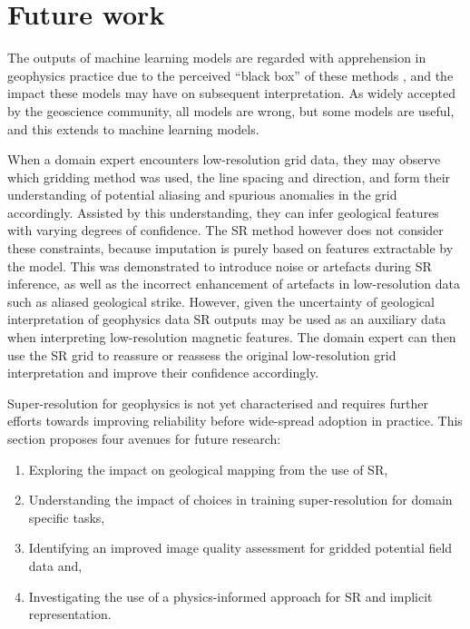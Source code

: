 % 
% 


\chapter{Future work}
\label{ch:futurework}
The outputs of machine learning models are regarded with apprehension in geophysics practice due to the perceived “black box” of these methods \parencite{delaatAlgorithmicDecisionMakingBased2018,rudinStopExplainingBlack2019}, and the impact these models may have on subsequent interpretation.
As widely accepted by the geoscience community, all models are wrong, but some models are useful, and this extends to machine learning models.

When a domain expert encounters low-resolution grid data, they may observe which gridding method was used, the line spacing and direction, and form their understanding of potential aliasing and spurious anomalies in the grid accordingly.
Assisted by this understanding, they can infer geological features with varying degrees of confidence.
The SR method however does not consider these constraints, because imputation is purely based on features extractable by the model.
This was demonstrated to introduce noise or artefacts during SR inference, as well as the incorrect enhancement of artefacts in low-resolution data such as aliased geological strike.
However, given the uncertainty of geological interpretation of geophysics data \parencite{sivarajahIdentifyingEffectiveInterpretation2013} SR outputs may be used as an auxiliary data when interpreting low-resolution magnetic features.
The domain expert can then use the SR grid to reassure or reassess the original low-resolution grid interpretation and improve their confidence accordingly.

Super-resolution for geophysics is not yet characterised and requires further efforts towards improving reliability before wide-spread adoption in practice.
This section proposes four avenues for future research:
\begin{enumerate}
    \item{} Exploring the impact on geological mapping from the use of SR,
    \item{} Understanding the impact of choices in training super-resolution for domain specific tasks,
    \item{} Identifying an improved image quality assessment for gridded potential field data and,
    \item{} Investigating the use of a physics-informed approach for SR and implicit representation.
\end{enumerate}


